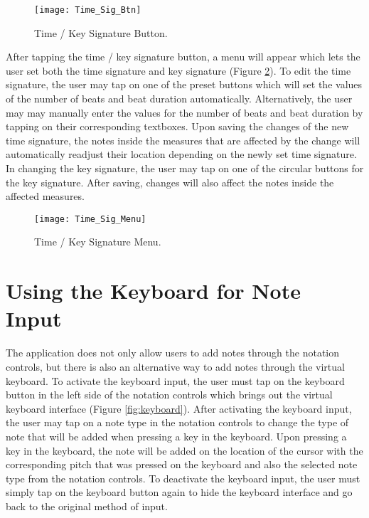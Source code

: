 \begin{figure}[H]
  \centering
  \texttt{[image: Time\_Sig\_Btn]}
    \caption{Time / Key Signature Button.}
    \label{fig:tim-sig-btn}
\end{figure}

After tapping the time / key signature button, a menu will appear which lets the user set both the time signature and key signature (Figure \ref{fig:tim-sig-menu}). To edit the time signature, the user may tap on one of the preset buttons which will set the values of the number of beats and beat duration automatically. Alternatively, the user may may manually enter the values for the number of beats and beat duration by tapping on their corresponding textboxes. Upon saving the changes of the new time signature, the notes inside the measures that are affected by the change will automatically readjust their location depending on the newly set time signature. In changing the key signature, the user may tap on one of the circular buttons for the key signature. After saving, changes will also affect the notes inside the affected measures.

\begin{figure}[H]
  \centering
  \texttt{[image: Time\_Sig\_Menu]}
    \caption{Time / Key Signature Menu.}
    \label{fig:tim-sig-menu}
\end{figure}

\section{Using the Keyboard for Note Input}
The application does not only allow users to add notes through the notation controls, but there is also an alternative way to add notes through the virtual keyboard. To activate the keyboard input, the user must tap on the keyboard button in the left side of the notation controls which brings out the virtual keyboard interface (Figure \ref{fig:keyboard}). After activating the keyboard input, the user may tap on a note type in the notation controls to change the type of note that will be added when pressing a key in the keyboard. Upon pressing a key in the keyboard, the note will be added on the location of the cursor with the corresponding pitch that was pressed on the keyboard and also the selected note type from the notation controls. To deactivate the keyboard input, the user must simply tap on the keyboard button again to hide the keyboard interface and go back to the original method of input.

